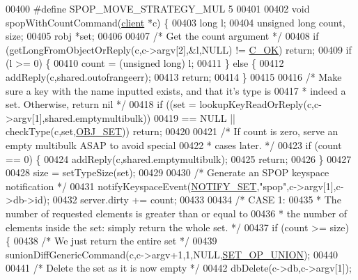 \begin{DoxyCode}
00400 \textcolor{preprocessor}{#}\textcolor{preprocessor}{define} \textcolor{preprocessor}{SPOP\_MOVE\_STRATEGY\_MUL} 5
00401 
00402 \textcolor{keywordtype}{void} spopWithCountCommand(\hyperlink{structclient}{client} *c) \{
00403     \textcolor{keywordtype}{long} l;
00404     \textcolor{keywordtype}{unsigned} \textcolor{keywordtype}{long} count, size;
00405     robj *set;
00406 
00407     \textcolor{comment}{/* Get the count argument */}
00408     \textcolor{keywordflow}{if} (getLongFromObjectOrReply(c,c->argv[2],&l,NULL) != \hyperlink{server_8h_a303769ef1065076e68731584e758d3e1}{C\_OK}) \textcolor{keywordflow}{return};
00409     \textcolor{keywordflow}{if} (l >= 0) \{
00410         count = (\textcolor{keywordtype}{unsigned} \textcolor{keywordtype}{long}) l;
00411     \} \textcolor{keywordflow}{else} \{
00412         addReply(c,shared.outofrangeerr);
00413         \textcolor{keywordflow}{return};
00414     \}
00415 
00416     \textcolor{comment}{/* Make sure a key with the name inputted exists, and that it's type is}
00417 \textcolor{comment}{     * indeed a set. Otherwise, return nil */}
00418     \textcolor{keywordflow}{if} ((set = lookupKeyReadOrReply(c,c->argv[1],shared.emptymultibulk))
00419         == NULL || checkType(c,set,\hyperlink{server_8h_a8d179375a4aac33d3fa7aa80c8ccc75f}{OBJ\_SET})) \textcolor{keywordflow}{return};
00420 
00421     \textcolor{comment}{/* If count is zero, serve an empty multibulk ASAP to avoid special}
00422 \textcolor{comment}{     * cases later. */}
00423     \textcolor{keywordflow}{if} (count == 0) \{
00424         addReply(c,shared.emptymultibulk);
00425         \textcolor{keywordflow}{return};
00426     \}
00427 
00428     size = setTypeSize(set);
00429 
00430     \textcolor{comment}{/* Generate an SPOP keyspace notification */}
00431     notifyKeyspaceEvent(\hyperlink{server_8h_a625aec945b2152a46979b1b21f2af274}{NOTIFY\_SET},\textcolor{stringliteral}{"spop"},c->argv[1],c->db->id);
00432     server.dirty += count;
00433 
00434     \textcolor{comment}{/* CASE 1:}
00435 \textcolor{comment}{     * The number of requested elements is greater than or equal to}
00436 \textcolor{comment}{     * the number of elements inside the set: simply return the whole set. */}
00437     \textcolor{keywordflow}{if} (count >= size) \{
00438         \textcolor{comment}{/* We just return the entire set */}
00439         sunionDiffGenericCommand(c,c->argv+1,1,NULL,\hyperlink{server_8h_af00a414b6d78bff8b325eb9cf82c3edb}{SET\_OP\_UNION});
00440 
00441         \textcolor{comment}{/* Delete the set as it is now empty */}
00442         dbDelete(c->db,c->argv[1]);

\end{DoxyCode}
